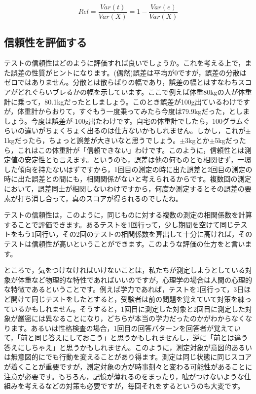\documentclass{ltjbook}
\begin{document}
\[ Rel = \frac{Var(t)}{Var(X)} = 1 - \frac{Var(e)}{Var(X)} \]


\subsection{信頼性を評価する}
テストの信頼性はどのように評価すれば良いでしょうか。これを考える上で，また誤差の性質がヒントになります。(偶然)誤差は平均が$0$ですが，誤差の分散はゼロではありません。分散とは散らばりの幅であり，誤差の幅とはすなわちスコアがどれぐらいブレるかの幅を示しています。ここで例えば体重80kgの人が体重計に乗って，80.1kgだったとしましょう。このとき誤差が100g出ているわけですが，体重計からおりて，すぐもう一度乗ってみたら今度は79.9kgだった，としましょう。今度は誤差が-100g出たわけです。自宅の体重計でしたら，100グラムぐらいの違いがちょくちょく出るのは仕方ないかもしれません。しかし，これが$\pm$1kgだったら，ちょっと誤差が大きいなと思うでしょう。$\pm$3kgとか$\pm$5kgだったら，これはこの体重計が「信頼できない」わけです。このように，信頼性とは測定値の安定性とも言えます。というのも，誤差は他の何ものとも相関せず，一環した傾向を持たないはずですから，1回目の測定の時に出た誤差と2回目の測定の時に出た誤差との間にも，相関関係がないと考えられるからです。複数回の測定において，誤差同士が相関しないわけですから，何度か測定するとその誤差の要素が打ち消し合って，真のスコアが得られるのでしたね。

テストの信頼性は，このように，同じものに対する複数の測定の相関係数を計算することで評価できます。あるテストを1回行って，少し期間を空けて同じテストをもう1回行い，その2回のテストの相関係数を算出して十分に高ければ，そのテストは信頼性が高いということができます。このような評価の仕方をと言います。

ところで，気をつけなければいけないことは，私たちが測定しようとしている対象が体重など物理的な特性であればいいのですが，心理学の場合は人間の心理的な特徴であるということです。例えば学力であれば，テストを1回行って，3日ほど開けて同じテストをしたとすると，受験者は前の問題を覚えていて対策を練っているかもしれません。そうすると，1回目に測定した対象と2回目に測定した対象が厳密には異なることになり，どちらが本当の学力だったのかがわからなくなります。あるいは性格検査の場合，1回目の回答パターンを回答者が覚えていて，「前と同じ答えにしておこう」と思うかもしれませんし，逆に「前とは違う答えにしちゃえ」と思うかもしれません。このように，測定対象が意図的あるいは無意図的にでも行動を変えることがあり得ます。測定は同じ状態に同じスコアが着くことが重要ですが，測定対象の方が時事刻々と変わる可能性があることに注意が必要です。もちろん，記憶が薄れるのをまったり，嘘がつけないような仕組みを考えるなどの対策も必要ですが，毎回それをするというのも大変です。
\end{document}
